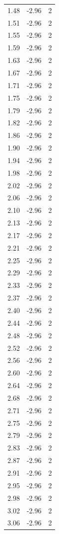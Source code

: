 \begin{longtable}{lrr}
  1.48 & -2.96 & 2 \\
  1.51 & -2.96 & 2 \\
  1.55 & -2.96 & 2 \\
  1.59 & -2.96 & 2 \\
  1.63 & -2.96 & 2 \\
  1.67 & -2.96 & 2 \\
  1.71 & -2.96 & 2 \\
  1.75 & -2.96 & 2 \\
  1.79 & -2.96 & 2 \\
  1.82 & -2.96 & 2 \\
  1.86 & -2.96 & 2 \\
  1.90 & -2.96 & 2 \\
  1.94 & -2.96 & 2 \\
  1.98 & -2.96 & 2 \\
  2.02 & -2.96 & 2 \\
  2.06 & -2.96 & 2 \\
  2.10 & -2.96 & 2 \\
  2.13 & -2.96 & 2 \\
  2.17 & -2.96 & 2 \\
  2.21 & -2.96 & 2 \\
  2.25 & -2.96 & 2 \\
  2.29 & -2.96 & 2 \\
  2.33 & -2.96 & 2 \\
  2.37 & -2.96 & 2 \\
  2.40 & -2.96 & 2 \\
  2.44 & -2.96 & 2 \\
  2.48 & -2.96 & 2 \\
  2.52 & -2.96 & 2 \\
  2.56 & -2.96 & 2 \\
  2.60 & -2.96 & 2 \\
  2.64 & -2.96 & 2 \\
  2.68 & -2.96 & 2 \\
  2.71 & -2.96 & 2 \\
  2.75 & -2.96 & 2 \\
  2.79 & -2.96 & 2 \\
  2.83 & -2.96 & 2 \\
  2.87 & -2.96 & 2 \\
  2.91 & -2.96 & 2 \\
  2.95 & -2.96 & 2 \\
  2.98 & -2.96 & 2 \\
  3.02 & -2.96 & 2 \\
  3.06 & -2.96 & 2 \\

\end{longtable}
